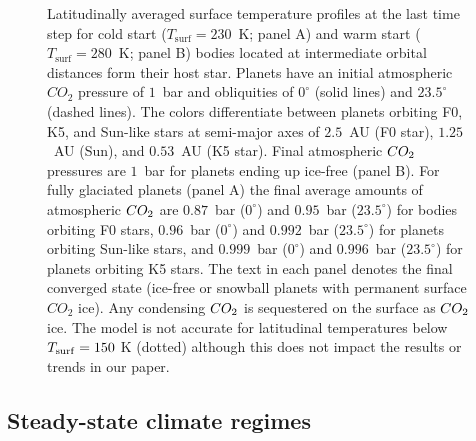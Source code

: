 \documentclass[fleqn,usenatbib]{mnras}
\begin{document}
\begin{figure}
    \caption{Latitudinally averaged surface temperature profiles at the last time step for cold start ($T_{\mathrm{surf}}=230$~K; panel A) and warm start ($T_{\mathrm{surf}}=280$~K; panel B) bodies located at intermediate orbital distances form their host star. Planets have an initial atmospheric $CO_{\mathrm{2}}$ pressure of $1$~bar and obliquities of $0^{\circ}$ (solid lines) and $23.5^{\circ}$ (dashed lines). The colors differentiate between planets orbiting F0, K5, and Sun-like stars at semi-major axes of $2.5$~AU (F0 star), $1.25$~AU (Sun), and $0.53$~AU (K5 star). Final atmospheric $CO_{\rm 2}$ pressures are $1$~bar for planets ending up ice-free (panel B). For fully glaciated planets (panel A) the final average amounts of atmospheric $CO_{\rm 2}$ are $0.87$~bar ($0^{\circ}$) and $0.95$~bar ($23.5^{\circ}$) for bodies orbiting F0 stars, $0.96$~bar ($0^{\circ}$) and $0.992$~bar ($23.5^{\circ}$) for planets orbiting Sun-like stars, and $0.999$~bar ($0^{\circ}$) and $0.996$~bar ($23.5^{\circ}$) for planets orbiting K5 stars. The text in each panel denotes the final converged state  (ice-free or snowball planets with permanent surface $CO_{\mathrm 2}$ ice). Any condensing $CO_{\rm 2}$ is sequestered on the surface as $CO_{\rm 2}$ ice. The model is not accurate for latitudinal temperatures below $T_{\rm surf}=150$ K (dotted) although this does not impact the results or trends in our paper.
    }
    \label{fig:comp_a0}
\end{figure}

\subsection{Steady-state climate regimes}
\end{document}
